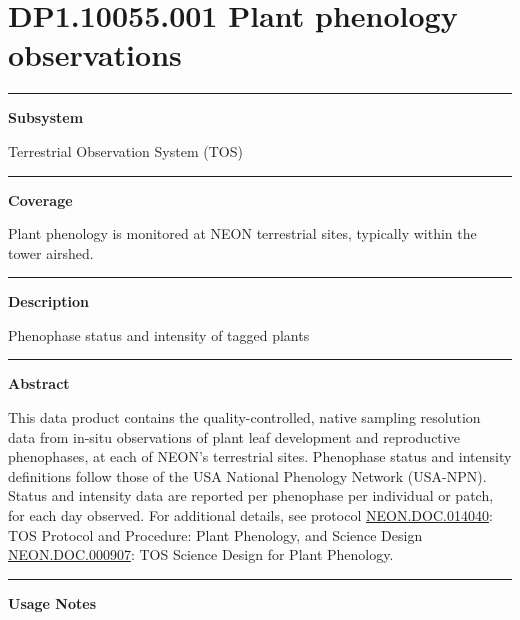 \documentclass[]{article}
\begin{document}
\section{DP1.10055.001 Plant phenology
observations}\label{dp1.10055.001-plant-phenology-observations}

\begin{center}\rule{0.5\linewidth}{\linethickness}\end{center}

\textbf{Subsystem}

Terrestrial Observation System (TOS)

\begin{center}\rule{0.5\linewidth}{\linethickness}\end{center}

\textbf{Coverage}

Plant phenology is monitored at NEON terrestrial sites, typically within
the tower airshed.

\begin{center}\rule{0.5\linewidth}{\linethickness}\end{center}

\textbf{Description}

Phenophase status and intensity of tagged plants

\begin{center}\rule{0.5\linewidth}{\linethickness}\end{center}

\textbf{Abstract}

This data product contains the quality-controlled, native sampling
resolution data from in-situ observations of plant leaf development and
reproductive phenophases, at each of NEON's terrestrial sites.
Phenophase status and intensity definitions follow those of the USA
National Phenology Network (USA-NPN). Status and intensity data are
reported per phenophase per individual or patch, for each day observed.
For additional details, see protocol
\href{http://data.neonscience.org/api/v0/documents/NEON.DOC.014040vJ}{NEON.DOC.014040}:
TOS Protocol and Procedure: Plant Phenology, and Science Design
\href{http://data.neonscience.org/api/v0/documents/NEON.DOC.000907vA}{NEON.DOC.000907}:
TOS Science Design for Plant Phenology.

\begin{center}\rule{0.5\linewidth}{\linethickness}\end{center}

\textbf{Usage Notes}
\end{document}
